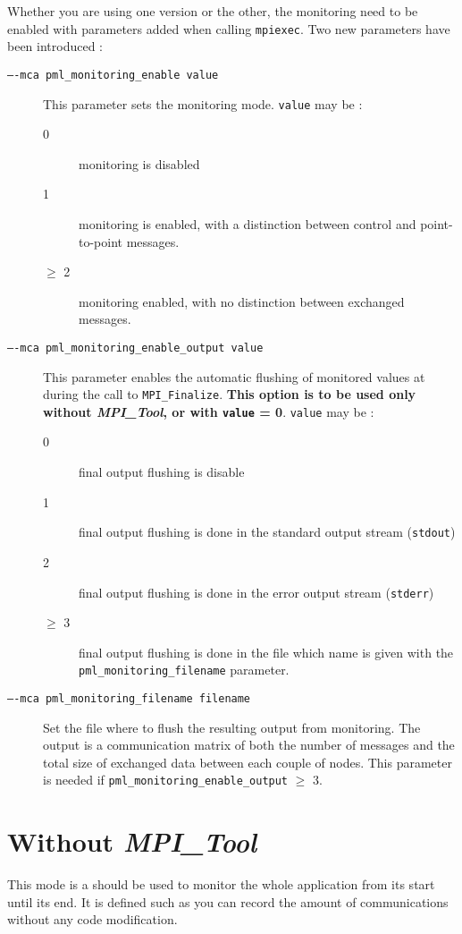 \documentclass[notitlepage]{article}
\newcommand{\mpit}[1]{\textit{MPI\_Tool#1}}
\begin{document}
Whether you are using one version or the other, the monitoring need to
be enabled with parameters added when calling \texttt{mpiexec}. Two new
parameters have been introduced :
\begin{description}
\item [\texttt{----mca pml\_monitoring\_enable value}] This parameter
  sets the monitoring mode. \texttt{value} may be :
  \begin{description}
  \item [0] monitoring is disabled
  \item [1] monitoring is enabled, with a distinction between control
    and point-to-point messages.
  \item [$\ge$ 2] monitoring enabled, with no distinction between
    exchanged messages.
  \end{description}
\item [\texttt{----mca pml\_monitoring\_enable\_output value}] This
  parameter enables the automatic flushing of monitored values at
  during the call to \texttt{MPI\_Finalize}. {\bf This option is to be
    used only without \mpit{}, or with \texttt{value} =
    0}. \texttt{value} may be :
  \begin{description}
  \item [0] final output flushing is disable
  \item [1] final output flushing is done in the standard output stream (\texttt{stdout})
  \item [2] final output flushing is done in the error output stream (\texttt{stderr})
  \item [$\ge$ 3] final output flushing is done in the file which name
    is given with the \texttt{pml\_monitoring\_filename} parameter.
  \end{description}
\item [\texttt{----mca pml\_monitoring\_filename filename}] Set the
  file where to flush the resulting output from monitoring. The output
  is a communication matrix of both the number of messages and the
  total size of exchanged data between each couple of nodes. This
  parameter is needed if \texttt{pml\_monitoring\_enable\_output}
  $\ge$ 3.
\end{description}

\section{Without \mpit{}}

This mode is a should be used to monitor the whole application from
its start until its end. It is defined such as you can record the
amount of communications without any code modification.
\end{document}
